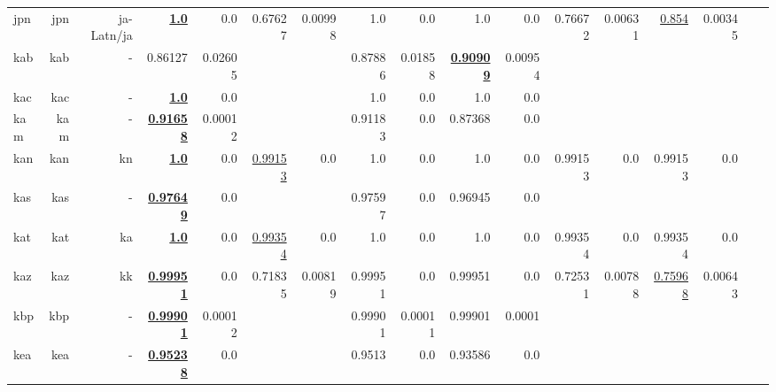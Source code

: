 \documentclass[11pt]{article}
\begin{document}
\begin{table*}[h]
{\begin{tabular}{lrrrrrrrrrrrrrrrr}
jpn         & jpn         & ja-Latn/ja         & \textbf{\underline{1.0}}         & 0.0         & 0.67627         & 0.00998         & 1.0         & 0.0         & 1.0         & 0.0         & 0.76672         & 0.00631         & \underline{0.854}         & 0.00345         \\
kab         & kab         & -         & 0.86127         & 0.02605         &          &          & 0.87886         & 0.01858         & \textbf{\underline{0.90909}}         & 0.00954         &          &          &          &          \\
kac         & kac         & -         & \textbf{\underline{1.0}}         & 0.0         &          &          & 1.0         & 0.0         & 1.0         & 0.0         &          &          &          &          \\
kam         & kam         & -         & \textbf{\underline{0.91658}}         & 0.00012         &          &          & 0.91183         & 0.0         & 0.87368         & 0.0         &          &          &          &          \\
kan         & kan         & kn         & \textbf{\underline{1.0}}         & 0.0         & \underline{0.99153}         & 0.0         & 1.0         & 0.0         & 1.0         & 0.0         & 0.99153         & 0.0         & 0.99153         & 0.0         \\
kas         & kas         & -         & \textbf{\underline{0.97649}}         & 0.0         &          &          & 0.97597         & 0.0         & 0.96945         & 0.0         &          &          &          &          \\
kat         & kat         & ka         & \textbf{\underline{1.0}}         & 0.0         & \underline{0.99354}         & 0.0         & 1.0         & 0.0         & 1.0         & 0.0         & 0.99354         & 0.0         & 0.99354         & 0.0         \\
kaz         & kaz         & kk         & \textbf{\underline{0.99951}}         & 0.0         & 0.71835         & 0.00819         & 0.99951         & 0.0         & 0.99951         & 0.0         & 0.72531         & 0.00788         & \underline{0.75968}         & 0.00643         \\
kbp         & kbp         & -         & \textbf{\underline{0.99901}}         & 0.00012         &          &          & 0.99901         & 0.00011         & 0.99901         & 0.0001         &          &          &          &          \\
kea         & kea         & -         & \textbf{\underline{0.95238}}         & 0.0         &          &          & 0.9513         & 0.0         & 0.93586         & 0.0         &          &          &          &          \\

\end{tabular}}
\end{table*}
\end{document}
